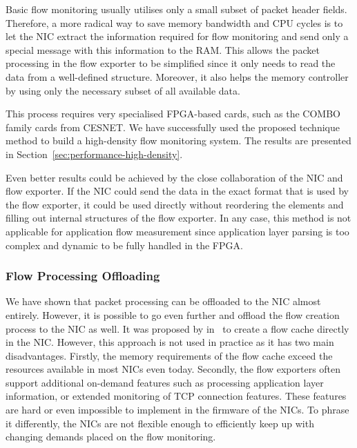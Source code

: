 Basic flow monitoring usually utilises only a small subset of packet header fields. Therefore, a more radical way to save memory bandwidth and CPU cycles is to let the NIC extract the information required for flow monitoring and send only a special message with this information to the RAM. This allows the packet processing in the flow exporter to be simplified since it only needs to read the data from a well-defined structure. Moreover, it also helps the memory controller by using only the necessary subset of all available data.

This process requires very specialised FPGA-based cards, such as the COMBO family cards from CESNET. We have successfully used the proposed technique method to build a high-density flow monitoring system. The results are presented in Section~\ref{sec:performance-high-density}.

Even better results could be achieved by the close collaboration of the NIC and flow exporter. If the NIC could send the data in the exact format that is used by the flow exporter, it could be used directly without reordering the elements and filling out internal structures of the flow exporter. In any case, this method is not applicable for application flow measurement since application layer parsing is too complex and dynamic to be fully handled in the FPGA.

\subsubsection{Flow Processing Offloading}
We have shown that packet processing can be offloaded to the NIC almost entirely. However, it is possible to go even further and offload the flow creation process to the NIC as well. It was proposed by \citeauthor{Zadnik-2008-Network} in~\cite{Zadnik-2008-Network} to create a flow cache directly in the NIC. However, this approach is not used in practice as it has two main disadvantages. Firstly, the memory requirements of the flow cache exceed the resources available in most NICs even today. Secondly, the flow exporters often support additional on-demand features such as processing application layer information, or extended monitoring of TCP connection features. These features are hard or even impossible to implement in the firmware of the NICs. To phrase it differently, the NICs are not flexible enough to efficiently keep up with changing demands placed on the flow monitoring.



